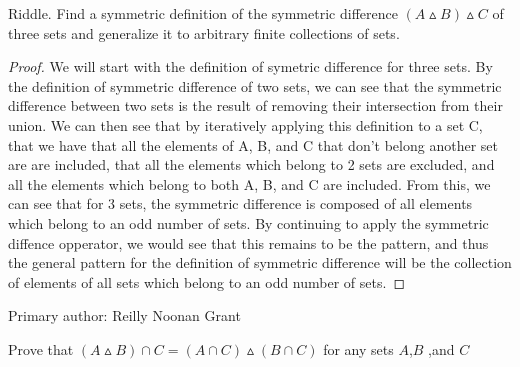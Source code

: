     \begin{minorEx}%
    Riddle. Find a symmetric definition of the symmetric difference $(A \vartriangle B) \vartriangle C$ of three sets and generalize it to arbitrary finite collections of sets.
   	\end{minorEx}
    \begin{proof}
    We will start with the definition of symetric  difference for three sets. By the definition of symmetric difference of two sets, we can see that the symmetric difference between two sets is the result of removing their intersection from their union. We can then see that by iteratively applying this definition to a set C, that we have that all the elements of A, B, and C that don't belong another set are are included, that all the elements which belong to 2 sets are excluded, and all the elements which belong to both A, B, and C are included. From this, we can see that for 3 sets, the symmetric difference is composed of all elements which belong to an odd number of sets. By continuing to apply the symmetric diffence opperator, we would see that this remains to be the pattern, and thus the general pattern for the definition of symmetric difference will be the collection of elements of all sets which belong to an odd number of sets.
    \end{proof}
Primary author: Reilly Noonan Grant
    \begin{minorEx}[Distributivity]%
    Prove that $(A \vartriangle B) \cap C = (A \cap C) \vartriangle (B \cap C)$ for any sets $A$,$B$ ,and $C$
   	\end{minorEx}

